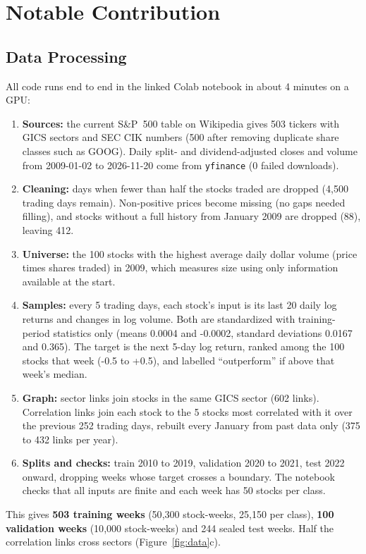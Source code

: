 \documentclass[final]{article}
\begin{document}
\section*{Notable Contribution}
\subsection*{Data Processing}
All code runs end to end in the linked Colab notebook in about 4 minutes on a GPU:
\begin{enumerate}
  \setlength{\itemsep}{1pt}\setlength{\parskip}{0pt}
  \item \textbf{Sources:} the current S\&P~500 table on Wikipedia gives 503 tickers with GICS sectors and SEC CIK numbers (500 after removing duplicate share classes such as GOOG). Daily split- and dividend-adjusted closes and volume from 2009-01-02 to 2026-11-20 come from \texttt{yfinance} (0 failed downloads).
  \item \textbf{Cleaning:} days when fewer than half the stocks traded are dropped (4{,}500 trading days remain). Non-positive prices become missing (no gaps needed filling), and stocks without a full history from January 2009 are dropped (88), leaving 412.
  \item \textbf{Universe:} the 100 stocks with the highest average daily dollar volume (price times shares traded) in 2009, which measures size using only information available at the start.
  \item \textbf{Samples:} every 5 trading days, each stock's input is its last 20 daily log returns and changes in log volume. Both are standardized with training-period statistics only (means 0.0004 and -0.0002, standard deviations 0.0167 and 0.365). The target is the next 5-day log return, ranked among the 100 stocks that week (-0.5 to +0.5), and labelled ``outperform'' if above that week's median.
  \item \textbf{Graph:} sector links join stocks in the same GICS sector (602 links). Correlation links join each stock to the 5 stocks most correlated with it over the previous 252 trading days, rebuilt every January from past data only (375 to 432 links per year).
  \item \textbf{Splits and checks:} train 2010 to 2019, validation 2020 to 2021, test 2022 onward, dropping weeks whose target crosses a boundary. The notebook checks that all inputs are finite and each week has 50 stocks per class.
\end{enumerate}

This gives \textbf{503 training weeks} (50{,}300 stock-weeks, 25{,}150 per class), \textbf{100 validation weeks} (10{,}000 stock-weeks) and 244 sealed test weeks. Half the correlation links cross sectors (Figure~\ref{fig:data}c).
\end{document}
